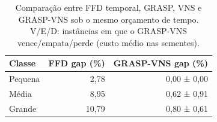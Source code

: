 \begin{table}[H]
\centering
\caption{Comparação entre FFD temporal, GRASP, VNS e GRASP-VNS sob o mesmo orçamento de tempo. V/E/D: instâncias em que o GRASP-VNS vence/empata/perde (custo médio nas sementes).}\label{tab:comparacao_metodos}
\small
\begin{tabular}{@{}lrr@{}}
\toprule
\textbf{Classe} & \textbf{FFD gap (\%)} & \textbf{GRASP-VNS gap (\%)} \\
\midrule
Pequena & 2,78 & 0,00 ± 0,00 \\
Média & 8,95 & 0,62 ± 0,91 \\
Grande & 10,79 & 0,80 ± 0,61 \\
\bottomrule
\end{tabular}
\end{table}
